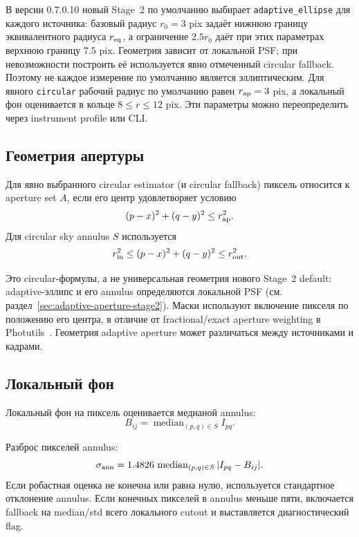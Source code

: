 В версии 0.7.0.10 новый Stage~2 по умолчанию выбирает \texttt{adaptive\_ellipse} для каждого источника: базовый радиус $r_0=3$ pix задаёт нижнюю границу эквивалентного радиуса $r_{\rm eq}$, а ограничение $2.5r_0$ даёт при этих параметрах верхнюю границу $7.5$ pix. Геометрия зависит от локальной PSF; при невозможности построить её используется явно отмеченный circular fallback. Поэтому не каждое измерение по умолчанию является эллиптическим. Для явного \texttt{circular} рабочий радиус по умолчанию равен $r_{\rm ap}=3$ pix, а локальный фон оценивается в кольце $8\le r\le12$ pix. Эти параметры можно переопределить через instrument profile или CLI.

\subsection{Геометрия апертуры}

Для явно выбранного circular estimator (и circular fallback) пиксель относится к aperture set $A$, если его центр удовлетворяет условию
\begin{equation}
  (p-x)^2+(q-y)^2 \le r_{\rm ap}^2.
\end{equation}
Для circular sky annulus $S$ используется
\begin{equation}
  r_{\rm in}^2 \le (p-x)^2+(q-y)^2 \le r_{\rm out}^2.
\end{equation}

Это circular-формулы, а не универсальная геометрия нового Stage~2 default: adaptive-эллипс и его annulus определяются локальной PSF (см. раздел~\ref{sec:adaptive-aperture-stage2}). Маски используют включение пикселя по положению его центра, в отличие от fractional/exact aperture weighting в Photutils~\cite{photutils_aperture}. Геометрия adaptive aperture может различаться между источниками и кадрами.

\subsection{Локальный фон}

Локальный фон на пиксель оценивается медианой annulus:
\begin{equation}
  B_{ij}=\operatorname{median}_{(p,q)\in S} I_{pq}.
\end{equation}

Разброс пикселей annulus:
\begin{equation}
  \sigma_{\rm ann}
  =1.4826\,\operatorname{median}_{(p,q)\in S}|I_{pq}-B_{ij}|.
\end{equation}
Если робастная оценка не конечна или равна нулю, используется стандартное отклонение annulus. Если конечных пикселей в annulus меньше пяти, включается fallback на median/std всего локального cutout и выставляется диагностический flag.

